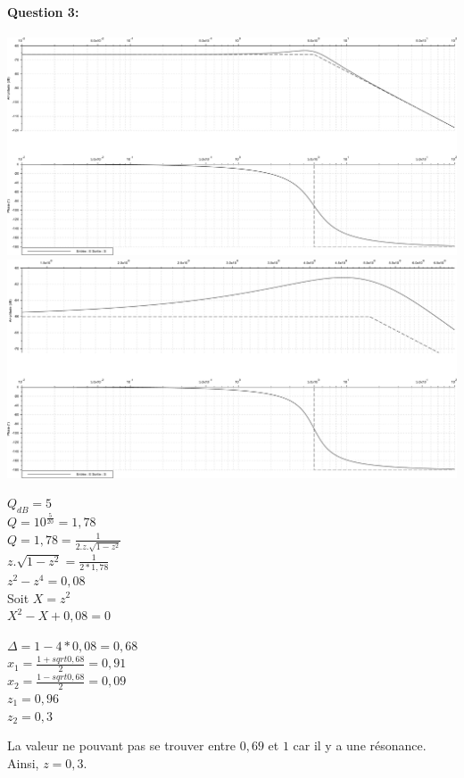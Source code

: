 \paragraph{Question 3:}

\begin{center}
 \includegraphics[width=0.8\linewidth]{img/exo_2_2_cor}\\
 \includegraphics[width=0.8\linewidth]{img/exo_2_2_cor_zoom}
\end{center}

\begin{minipage}{0.45\linewidth}
$Q_{dB}=5$ \\
$Q=10^{\frac{5}{20}}=1,78$\\
$Q=1,78=\frac{1}{2.z.\sqrt{1-z^2}}$ \\
$z.\sqrt{1-z^2}=\frac{1}{2*1,78}$ \\
$z^2-z^4=0,08$ \\
Soit $X=z^2$ \\
$X^2-X+0,08=0$
\end{minipage}\hfill
\begin{minipage}{0.45\linewidth}
$\Delta=1-4*0,08=0,68$ \\
$x_1=\frac{1+sqrt{0,68}}{2}=0,91$ \\
$x_2=\frac{1-sqrt{0,68}}{2}=0,09$ \\
$z_1=0,96$ \\
$z_2=0,3$
\end{minipage}

La valeur ne pouvant pas se trouver entre $0,69$ et $1$ car il y a une résonance. Ainsi, $z=0,3$.

